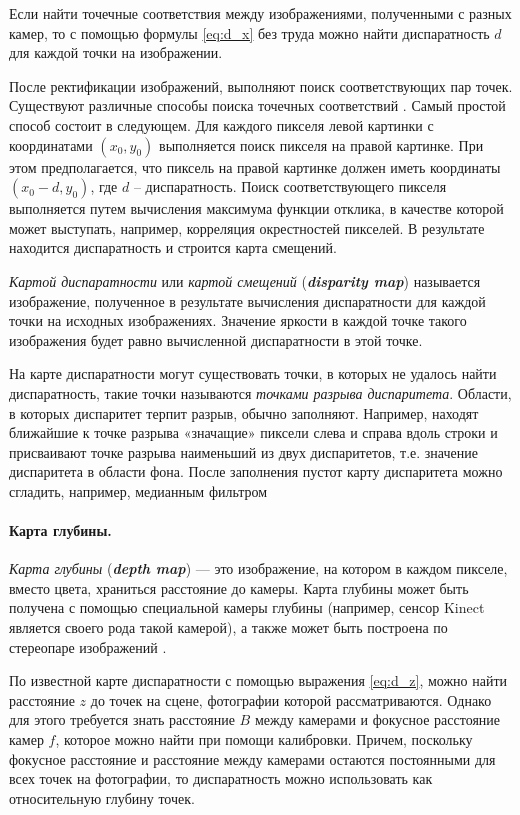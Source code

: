 \documentclass[oneside,final,12pt]{scrartcl}
\begin{document}
			Если найти точечные соответствия между изображениями, полученными с разных камер, то с помощью формулы \eqref{eq:d_x} без труда можно найти диспаратность \(d\) для каждой точки на изображении.

			После ректификации изображений, выполняют поиск соответствующих пар точек. Существуют различные способы поиска точечных соответствий \cite{Parchami2014}. Самый простой способ состоит в следующем. Для каждого пикселя левой картинки с координатами \((x_0, y_0)\) выполняется поиск пикселя на правой картинке. При этом предполагается, что пиксель на правой картинке должен иметь координаты \((x_0 - d, y_0)\), где \(d\) -- диспаратность. Поиск соответствующего пикселя выполняется путем вычисления максимума функции отклика, в качестве которой может выступать, например, корреляция окрестностей пикселей. В результате находится диспаратность и строится карта смещений.

			\textit{Картой диспаратности} или \textit{картой смещений} (\textbf{\textit{disparity map}}) называется изображение, полученное в результате вычисления диспаратности для каждой точки на исходных изображениях. Значение яркости в каждой точке такого изображения будет равно вычисленной диспаратности в этой точке.

			На карте диспаратности могут существовать точки, в которых не удалось найти диспаратность, такие точки называются \textit{точками разрыва диспаритета}.
			Области, в которых диспаритет терпит разрыв, обычно заполняют. Например, находят ближайшие к точке разрыва «значащие» пиксели слева и справа вдоль строки и присваивают точке разрыва наименьший из двух диспаритетов, т.е. значение диспаритета в области фона. После заполнения пустот карту диспаритета можно сгладить, например, медианным фильтром

			\paragraph{Карта глубины.} \textit{Карта глубины} (\textit{\textbf{depth map}}) — это изображение, на котором в каждом пикселе, вместо цвета, храниться расстояние до камеры. Карта глубины может быть получена с помощью специальной камеры глубины (например, сенсор Kinect является своего рода такой камерой), а также может быть построена по стереопаре изображений \cite{Bradski2008}.

			По известной карте диспаратности с помощью выражения \eqref{eq:d_z}, можно найти расстояние \(z\) до точек на сцене, фотографии которой рассматриваются. Однако для этого требуется знать расстояние \(B\) между камерами и фокусное расстояние камер \(f\), которое можно найти при помощи калибровки. Причем, поскольку фокусное расстояние и расстояние между камерами остаются постоянными для всех точек на фотографии, то диспаратность можно использовать как относительную глубину точек.
\end{document}
